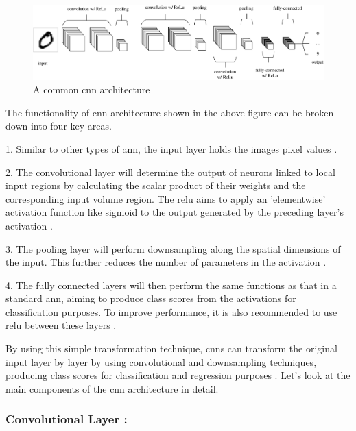 \begin{figure}[ht!]
    \centering
    \includegraphics[width=1\linewidth]{Rohit_Master_Thesis//Images/cnn_architecture.pdf}
    \caption{A common \gls{cnn} architecture \cite{oshea2015introductionconvolutionalneuralnetworks}}
    \label{fig:cnn architecture}
\end{figure}

The functionality of \gls{cnn} architecture shown in the above figure can be broken down into four key areas.

1. Similar to other types of \gls{ann}, the input layer holds the images pixel values \cite{oshea2015introductionconvolutionalneuralnetworks}.

2. The convolutional layer will determine the output of neurons linked to local input regions by calculating the scalar product of their weights and the corresponding input volume region. The \gls{relu} aims to apply an 'elementwise' activation function like sigmoid to the output generated by the preceding layer's activation \cite{oshea2015introductionconvolutionalneuralnetworks}.

3. The pooling layer will perform downsampling along the spatial dimensions of the input. This further reduces the number of parameters in the activation \cite{oshea2015introductionconvolutionalneuralnetworks}.

4. The fully connected layers will then perform the same functions as that in a standard \gls{ann}, aiming to produce class scores from the activations for classification purposes. To improve performance, it is also recommended to use \gls{relu} between these layers \cite{oshea2015introductionconvolutionalneuralnetworks}. 

By using this simple transformation technique, \glspl{cnn} can transform the original input layer by layer by using convolutional and downsampling techniques, producing class scores for classification and regression purposes \cite{oshea2015introductionconvolutionalneuralnetworks}. Let's look at the main components of the \gls{cnn} architecture in detail.

\subsubsection*{Convolutional Layer :}

